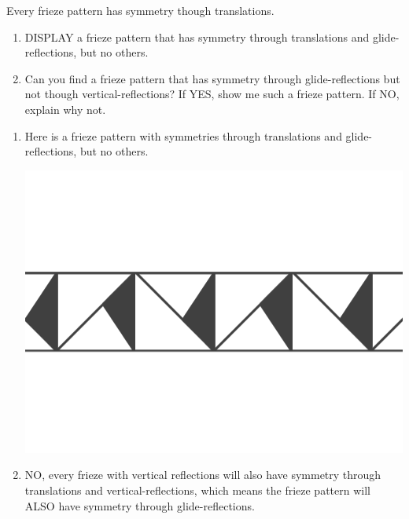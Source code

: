 \documentclass[noauthor,nooutcomes,12pt,hints]{ximera}
\begin{document}
\begin{question}
  Every frieze pattern has symmetry though translations.
  \begin{enumerate}
    \item DISPLAY a frieze pattern that has symmetry through
      translations and glide-reflections, but no others.
    \item Can you find a frieze pattern that has symmetry through
    glide-reflections but not though vertical-reflections? If YES, show
    me such a frieze pattern. If NO, explain why not.
  \end{enumerate}
  \begin{freeResponse}
    \begin{enumerate}
      \item Here is a frieze pattern with symmetries through
        translations and glide-reflections, but no others.
        \begin{center}
          \includegraphics[width=.6\textwidth]{ansGR.png}
        \end{center}
      \item NO, every frieze with vertical reflections will also have
        symmetry through translations and vertical-reflections, which
        means the frieze pattern will ALSO have symmetry through
        glide-reflections.
    \end{enumerate}
  \end{freeResponse}
\end{question}
\mynewpage
\end{document}
